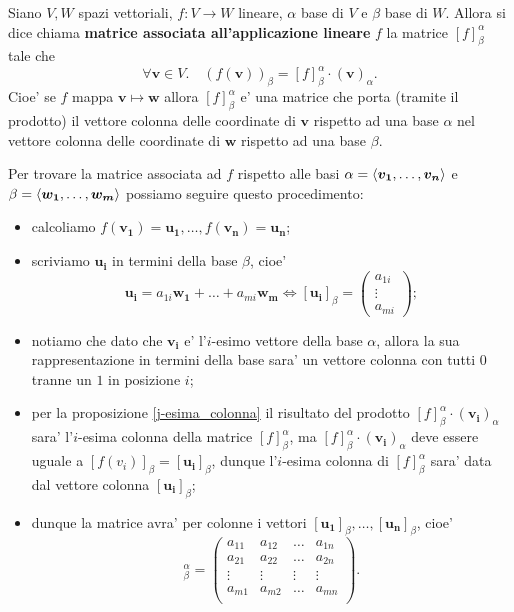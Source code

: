 \begin{definition}
    Siano $V, W$ spazi vettoriali, $f : V \to W$ lineare, $\alpha$ base di $V$ e $\beta$ base di $W$. Allora si dice chiama \textbf{matrice associata all'applicazione lineare} $f$ la matrice $[f]^{\alpha}_{\beta}$ tale che
    \begin{equation}
        \forall \bm{v} \in V. \quad \left( f(\bm{v}) \right)_{\beta} = [f]^{\alpha}_{\beta} \cdot (\bm{v})_{\alpha}.
    \end{equation}
    Cioe' se $f$ mappa $\bm{v} \mapsto \bm{w}$ allora $[f]^{\alpha}_{\beta}$ e' una matrice che porta (tramite il prodotto) il vettore colonna delle coordinate di $\bm{v}$ rispetto ad una base $\alpha$ nel vettore colonna delle coordinate di $\bm{w}$ rispetto ad una base $\beta$.
\end{definition}

Per trovare la matrice associata ad $f$ rispetto alle basi $\alpha = \left\langle \bm{v_1}, \dots, \bm{v_n} \right\rangle$ e $\beta = \left\langle \bm{w_1}, \dots, \bm{w_m} \right\rangle$ possiamo seguire questo procedimento:
\begin{itemize}
    \item calcoliamo $f(\bm{v_1}) = \bm{u_1}, \dots, f(\bm{v_n}) = \bm{u_n}$;
    \item scriviamo $\bm{u_i}$ in termini della base $\beta$, cioe' \begin{equation*}
        \bm{u_i} = a_{1i}\bm{w_1} + \dots + a_{mi}\bm{w_m} \iff [\bm{u_i}]_{\beta} = \begin{pmatrix}
            a_{1i} \\ \vdots \\ a_{mi}
        \end{pmatrix};
    \end{equation*}
    \item notiamo che dato che $\bm{v_i}$ e' l'$i$-esimo vettore della base $\alpha$, allora la sua rappresentazione in termini della base sara' un vettore colonna con tutti $0$ tranne un $1$ in posizione $i$;
    \item per la proposizione \ref{j-esima_colonna} il risultato del prodotto $[f]^{\alpha}_{\beta} \cdot (\bm{v_i})_{\alpha}$ sara' l'$i$-esima colonna della matrice $[f]^{\alpha}_{\beta}$, ma $[f]^{\alpha}_{\beta} \cdot (\bm{v_i})_{\alpha}$ deve essere uguale a $[f(v_i)]_{\beta} = [\bm{u_i}]_{\beta}$, dunque l'$i$-esima colonna di $[f]^{\alpha}_{\beta}$ sara' data dal vettore colonna $[\bm{u_i}]_{\beta}$;
    \item dunque la matrice avra' per colonne i vettori $[\bm{u_1}]_{\beta}, \dots, [\bm{u_n}]_{\beta}$, cioe'
    \begin{equation}
        [f]^{\alpha}_{\beta} = \begin{pmatrix}
            a_{11} & a_{12} & \dots & a_{1n} \\
            a_{21} & a_{22} & \dots & a_{2n} \\
            \vdots & \vdots & \vdots& \vdots \\
            a_{m1} & a_{m2} & \dots & a_{mn} \\
        \end{pmatrix}.
    \end{equation}
\end{itemize}


